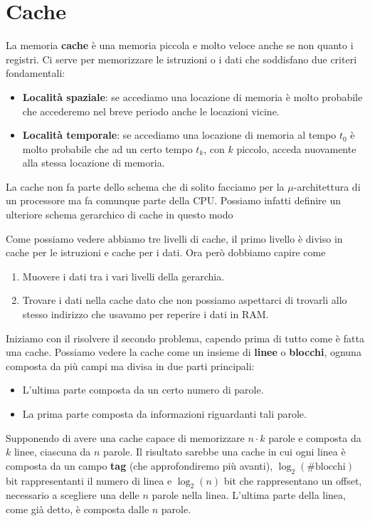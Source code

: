 \section{Cache}
La memoria \textbf{cache} è una memoria piccola e molto veloce anche se non quanto i registri.
Ci serve per memorizzare le istruzioni o i dati che soddisfano due criteri fondamentali:
\begin{itemize}
	\item \textbf{Località spaziale}: se accediamo una locazione di memoria è molto probabile che
	      accederemo nel breve periodo anche le locazioni vicine.
	\item \textbf{Località temporale}: se accediamo una locazione di memoria al tempo $t_0$ è molto
	      probabile che ad un certo tempo $t_k$, con $k$ piccolo, acceda nuovamente alla stessa
	      locazione di memoria.
\end{itemize}
La cache non fa parte dello schema che di solito facciamo per la $\mu$-architettura di un
processore ma fa comunque parte della CPU. Possiamo infatti definire un ulteriore schema gerarchico
di cache in questo modo
\begin{center}
	
\end{center}
Come possiamo vedere abbiamo tre livelli di cache, il primo livello è diviso in cache per le
istruzioni e cache per i dati. Ora però dobbiamo capire come
\begin{enumerate}
	\item Muovere i dati tra i vari livelli della gerarchia.
	\item Trovare i dati nella cache dato che non possiamo aspettarci di trovarli allo stesso
	      indirizzo che usavamo per reperire i dati in RAM.
\end{enumerate}
Iniziamo con il risolvere il secondo problema, capendo prima di tutto come è fatta una cache.
Possiamo vedere la cache come un insieme di \textbf{linee} o \textbf{blocchi}, ognuna composta da
più campi ma divisa in due parti principali:
\begin{itemize}
	\item L'ultima parte composta da un certo numero di parole.
	\item La prima parte composta da informazioni riguardanti tali parole.
\end{itemize}
Supponendo di avere una cache capace di memorizzare $n \cdot k$ parole e composta da $k$ linee,
ciascuna da $n$ parole. Il risultato sarebbe una cache in cui ogni linea è composta da un campo
\textbf{tag} (che approfondiremo più avanti), $\log_2 (\# \text{blocchi})$ bit rappresentanti il
numero di linea e $\log_2 (n)$ bit che rappresentano un offset, necessario a scegliere una delle
$n$ parole nella linea. L'ultima parte della linea, come già detto, è composta dalle $n$ parole.


